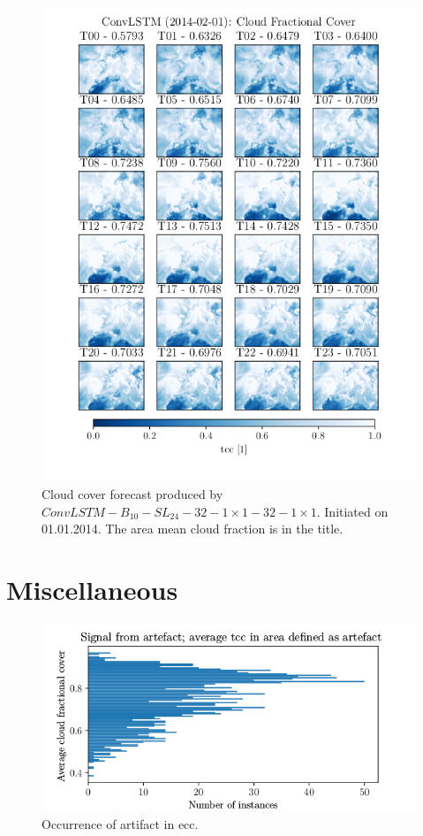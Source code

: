\begin{figure}[ht]
    \centering
    \includegraphics{python_figs/timelapse_convlstm_1x1_24hrs_from_2014-02-01.png}
    \caption{Cloud cover forecast produced by $ConvLSTM-B_{10}-SL_{24}-32-1\times1-32-1\times1$. Initiated on 01.01.2014. The area mean  cloud fraction is in the title.}
    \label{fig:timelapse_1x1}
\end{figure}
\cleardoublepage
\chapter{Miscellaneous} \label{app:misc}
\begin{figure}[ht]
    \centering
    \includegraphics{python_figs/signal_artefact.png}
    \caption{Occurrence of artifact in \acrshort{ecc}.}
    \label{fig:signal_artefact}
\end{figure}

